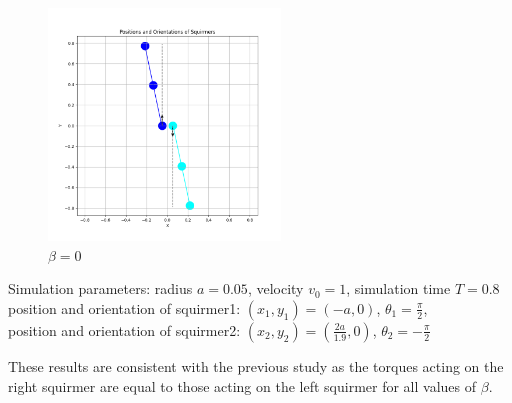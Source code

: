 \documentclass{article}
\begin{document}
\begin{figure}[H]
\begin{minipage}{0.49\textwidth}
        \caption{\footnotesize $\beta = 3$}
    \end{minipage}
    \includegraphics[width=0.55\textwidth]{graphs/simulations/sim_sq_sq/beta0/mpi_2_.png}
    \caption{\footnotesize $\beta = 0$}
\end{figure}
\begin{center}
    Simulation parameters: radius $a=0.05$, velocity $v_0=1$, simulation time $T=0.8$\\
        position and orientation of squirmer1: $(x_1,y_1)=(-a,0)$, $\theta_1=\frac{\pi}{2}$,\\
        position and orientation of squirmer2: $(x_2,y_2)=(\frac{2a}{1.9},0)$, $\theta_2=-\frac{\pi}{2}$
\end{center}
These results are consistent with the previous study\cite{Stark} as the torques acting on the right squirmer are equal to
those acting on the left squirmer for all values of $\beta$.
\end{document}
